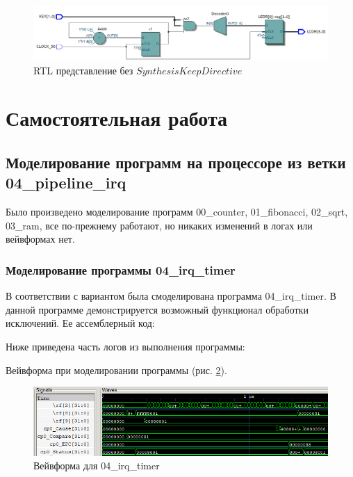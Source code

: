\documentclass[a4paper,14pt]{article}
\begin{document}
	
	\begin{figure}[H]
		\centering
		\includegraphics[width=0.7\linewidth]{images/rtl_2}
		\caption{RTL представление без $Synthesis Keep Directive$}
		\label{fig:rtl2}
	\end{figure}	
	
	\section{Самостоятельная работа}
	

	\subsection{Моделирование программ на процессоре из ветки 04\_pipeline\_irq}
	
	Было произведено моделирование программ  00\_counter, 01\_fibonacci, 02\_sqrt, 03\_ram, все по-прежнему работают, но никаких изменений в логах или вейвформах нет.
	
	\subsubsection{Моделирование программы 04\_irq\_timer}
	
	В соответствии с вариантом была смоделирована программа 04\_irq\_timer.
	В данной программе демонстрируется возможный функционал обработки исключений.
	Ее ассемблерный код:
	
	{\small {}}
	
	Ниже приведена часть логов из выполнения программы:
	
	{\small {}}
	
	Вейвформа при моделировании программы (рис. \ref{fig:0404wvf}).
	
	\begin{figure}[H]
		\centering
		\includegraphics[width=0.95\linewidth]{images/04_04_wvf}
		\caption{Вейвформа для  04\_irq\_timer}
		\label{fig:0404wvf}
	\end{figure}
\end{document}
